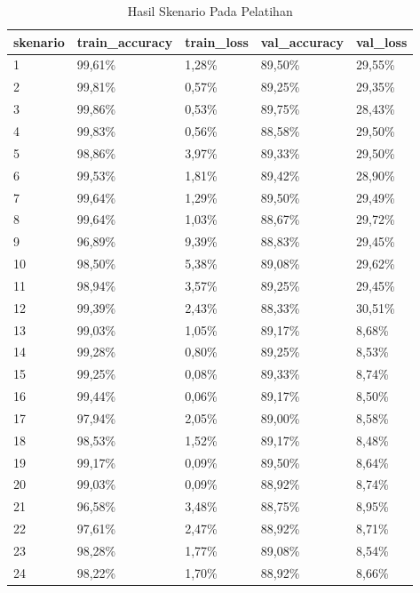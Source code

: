 \begin{longtable}[c]{|l|l|l|l|l|}
  \caption{Hasil Skenario Pada Pelatihan}
  \label{tab:result_training_scenario}                                 \\
  \hline
  skenario & train\_accuracy & train\_loss & val\_accuracy & val\_loss \\ \hline
  \endhead
  1        & 99,61\%         & 1,28\%      & 89,50\%       & 29,55\%   \\ \hline
  2        & 99,81\%         & 0,57\%      & 89,25\%       & 29,35\%   \\ \hline
  3        & 99,86\%         & 0,53\%      & 89,75\%       & 28,43\%   \\ \hline
  4        & 99,83\%         & 0,56\%      & 88,58\%       & 29,50\%   \\ \hline
  5        & 98,86\%         & 3,97\%      & 89,33\%       & 29,50\%   \\ \hline
  6        & 99,53\%         & 1,81\%      & 89,42\%       & 28,90\%   \\ \hline
  7        & 99,64\%         & 1,29\%      & 89,50\%       & 29,49\%   \\ \hline
  8        & 99,64\%         & 1,03\%      & 88,67\%       & 29,72\%   \\ \hline
  9        & 96,89\%         & 9,39\%      & 88,83\%       & 29,45\%   \\ \hline
  10       & 98,50\%         & 5,38\%      & 89,08\%       & 29,62\%   \\ \hline
  11       & 98,94\%         & 3,57\%      & 89,25\%       & 29,45\%   \\ \hline
  12       & 99,39\%         & 2,43\%      & 88,33\%       & 30,51\%   \\ \hline
  13       & 99,03\%         & 1,05\%      & 89,17\%       & 8,68\%    \\ \hline
  14       & 99,28\%         & 0,80\%      & 89,25\%       & 8,53\%    \\ \hline
  15       & 99,25\%         & 0,08\%      & 89,33\%       & 8,74\%    \\ \hline
  16       & 99,44\%         & 0,06\%      & 89,17\%       & 8,50\%    \\ \hline
  17       & 97,94\%         & 2,05\%      & 89,00\%       & 8,58\%    \\ \hline
  18       & 98,53\%         & 1,52\%      & 89,17\%       & 8,48\%    \\ \hline
  19       & 99,17\%         & 0,09\%      & 89,50\%       & 8,64\%    \\ \hline
  20       & 99,03\%         & 0,09\%      & 88,92\%       & 8,74\%    \\ \hline
  21       & 96,58\%         & 3,48\%      & 88,75\%       & 8,95\%    \\ \hline
  22       & 97,61\%         & 2,47\%      & 88,92\%       & 8,71\%    \\ \hline
  23       & 98,28\%         & 1,77\%      & 89,08\%       & 8,54\%    \\ \hline
  24       & 98,22\%         & 1,70\%      & 88,92\%       & 8,66\%    \\ \hline
\end{longtable}


